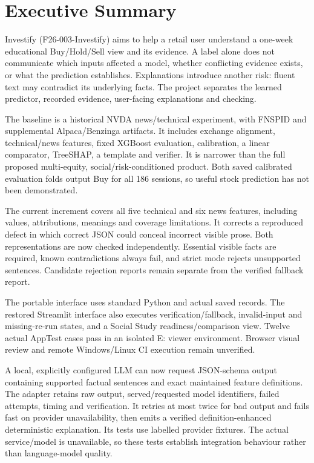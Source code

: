 \chapter*{Executive Summary}
Investify (F26-003-Investify) aims to help a retail user understand a one-week educational Buy/Hold/Sell view and its evidence. A label alone does not communicate which inputs affected a model, whether conflicting evidence exists, or what the prediction establishes. Explanations introduce another risk: fluent text may contradict its underlying facts. The project separates the learned predictor, recorded evidence, user-facing explanations and checking.

The baseline is a historical NVDA news/technical experiment, with FNSPID and supplemental Alpaca/Benzinga artifacts. It includes exchange alignment, technical/news features, fixed XGBoost evaluation, calibration, a linear comparator, TreeSHAP, a template and verifier. It is narrower than the full proposed multi-equity, social/risk-conditioned product. Both saved calibrated evaluation folds output Buy for all 186 sessions, so useful stock prediction has not been demonstrated.

The current increment covers all five technical and six news features, including values, attributions, meanings and coverage limitations. It corrects a reproduced defect in which correct JSON could conceal incorrect visible prose. Both representations are now checked independently. Essential visible facts are required, known contradictions always fail, and strict mode rejects unsupported sentences. Candidate rejection reports remain separate from the verified fallback report.

The portable interface uses standard Python and actual saved records. The restored Streamlit interface also executes verification/fallback, invalid-input and missing-re-run states, and a Social Study readiness/comparison view. Twelve actual AppTest cases pass in an isolated E: viewer environment. Browser visual review and remote Windows/Linux CI execution remain unverified.

A local, explicitly configured LLM can now request JSON-schema output containing supported factual sentences and exact maintained feature definitions. The adapter retains raw output, served/requested model identifiers, failed attempts, timing and verification. It retries at most twice for bad output and fails fast on provider unavailability, then emits a verified definition-enhanced deterministic explanation. Its tests use labelled provider fixtures. The actual service/model is unavailable, so these tests establish integration behaviour rather than language-model quality.

